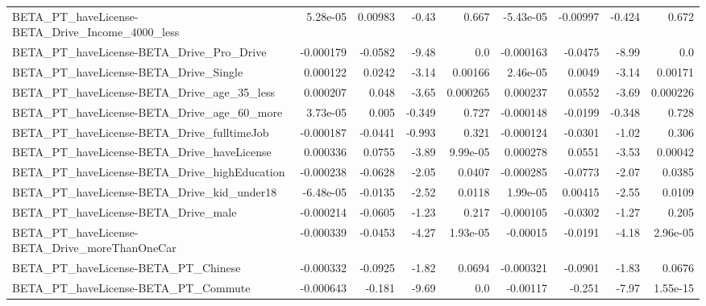 \begin{tabular}{lrrrrrrrr}
BETA\_PT\_haveLicense-BETA\_Drive\_Income\_4000\_less    &    5.28e-05 &      0.00983 &     -0.43 &    0.667 &  -5.43e-05 &    -0.00997 &       -0.424 &         0.672 \\
BETA\_PT\_haveLicense-BETA\_Drive\_Pro\_Drive           &   -0.000179 &      -0.0582 &     -9.48 &      0.0 &  -0.000163 &     -0.0475 &        -8.99 &           0.0 \\
BETA\_PT\_haveLicense-BETA\_Drive\_Single              &    0.000122 &       0.0242 &     -3.14 &  0.00166 &   2.46e-05 &      0.0049 &        -3.14 &       0.00171 \\
BETA\_PT\_haveLicense-BETA\_Drive\_age\_35\_less         &    0.000207 &        0.048 &     -3.65 & 0.000265 &   0.000237 &      0.0552 &        -3.69 &      0.000226 \\
BETA\_PT\_haveLicense-BETA\_Drive\_age\_60\_more         &    3.73e-05 &        0.005 &    -0.349 &    0.727 &  -0.000148 &     -0.0199 &       -0.348 &         0.728 \\
BETA\_PT\_haveLicense-BETA\_Drive\_fulltimeJob         &   -0.000187 &      -0.0441 &    -0.993 &    0.321 &  -0.000124 &     -0.0301 &        -1.02 &         0.306 \\
BETA\_PT\_haveLicense-BETA\_Drive\_haveLicense         &    0.000336 &       0.0755 &     -3.89 & 9.99e-05 &   0.000278 &      0.0551 &        -3.53 &       0.00042 \\
BETA\_PT\_haveLicense-BETA\_Drive\_highEducation       &   -0.000238 &      -0.0628 &     -2.05 &   0.0407 &  -0.000285 &     -0.0773 &        -2.07 &        0.0385 \\
BETA\_PT\_haveLicense-BETA\_Drive\_kid\_under18         &   -6.48e-05 &      -0.0135 &     -2.52 &   0.0118 &   1.99e-05 &     0.00415 &        -2.55 &        0.0109 \\
BETA\_PT\_haveLicense-BETA\_Drive\_male                &   -0.000214 &      -0.0605 &     -1.23 &    0.217 &  -0.000105 &     -0.0302 &        -1.27 &         0.205 \\
BETA\_PT\_haveLicense-BETA\_Drive\_moreThanOneCar      &   -0.000339 &      -0.0453 &     -4.27 & 1.93e-05 &   -0.00015 &     -0.0191 &        -4.18 &      2.96e-05 \\
BETA\_PT\_haveLicense-BETA\_PT\_Chinese                &   -0.000332 &      -0.0925 &     -1.82 &   0.0694 &  -0.000321 &     -0.0901 &        -1.83 &        0.0676 \\
BETA\_PT\_haveLicense-BETA\_PT\_Commute                &   -0.000643 &       -0.181 &     -9.69 &      0.0 &   -0.00117 &      -0.251 &        -7.97 &      1.55e-15 \\

\end{tabular}
